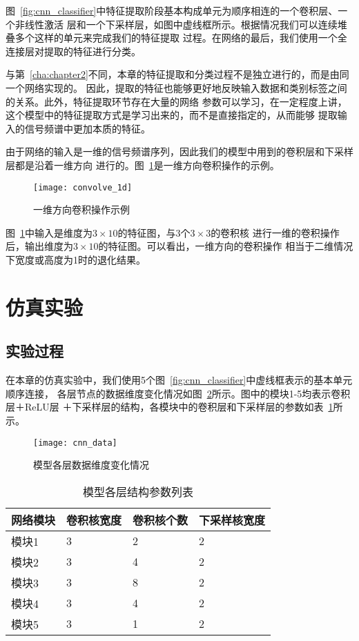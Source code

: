 图~\ref{fig:cnn_classifier}中特征提取阶段基本构成单元为顺序相连的一个卷积层、一个非线性激活
层和一个下采样层，如图中虚线框所示。根据情况我们可以连续堆叠多个这样的单元来完成我们的特征提取
过程。在网络的最后，我们使用一个全连接层对提取的特征进行分类。

与第~\ref{cha:chapter2}不同，本章的特征提取和分类过程不是独立进行的，而是由同一个网络实现的。
因此，提取的特征也能够更好地反映输入数据和类别标签之间的关系。此外，特征提取环节存在大量的网络
参数可以学习，在一定程度上讲，这个模型中的特征提取方式是学习出来的，而不是直接指定的，从而能够
提取输入的信号频谱中更加本质的特征。

由于网络的输入是一维的信号频谱序列，因此我们的模型中用到的卷积层和下采样层都是沿着一维方向
进行的。图~\ref{fig:convolve_1d}是一维方向卷积操作的示例。
\begin{figure}[ht]
  \centering%
  \texttt{[image: convolve\_1d]}
  \caption{一维方向卷积操作示例}
  \label{fig:convolve_1d}
\end{figure}

图~\ref{fig:convolve_1d}中输入是维度为$3\times10$的特征图，与3个$3\times 3$的卷积核
进行一维的卷积操作后，输出维度为$3\times 10$的特征图。可以看出，一维方向的卷积操作
相当于二维情况下宽度或高度为1时的退化结果。

\section{仿真实验}

\subsection{实验过程}

在本章的仿真实验中，我们使用5个图~\ref{fig:cnn_classifier}中虚线框表示的基本单元顺序连接，
各层节点的数据维度变化情况如图~\ref{fig:cnn_data}所示。图中的模块1-5均表示卷积层＋ReLU层
＋下采样层的结构，各模块中的卷积层和下采样层的参数如表~\ref{tab:layer_parameters}所示。
\begin{figure}[ht]
  \centering%
  \texttt{[image: cnn\_data]}
  \caption{模型各层数据维度变化情况}
  \label{fig:cnn_data}
\end{figure}

\begin{table}[htb]
  \centering
  \begin{minipage}[t]{0.8\linewidth} %
  \caption{模型各层结构参数列表}
  \label{tab:layer_parameters}
    \begin{tabularx}{\linewidth}{lXXX}
      \toprule[1.5pt]
      网络模块 & 卷积核宽度 & 卷积核个数 & 下采样核宽度 \\\midrule[1pt]
      模块1 & 3 & 2 & 2 \\
      模块2 & 3 & 4 & 2 \\
      模块3 & 3 & 8 & 2 \\
      模块4 & 3 & 4 & 2 \\
      模块5 & 3 & 1 & 2 \\
      \bottomrule[1.5pt]
    \end{tabularx}
  \end{minipage}
\end{table}

